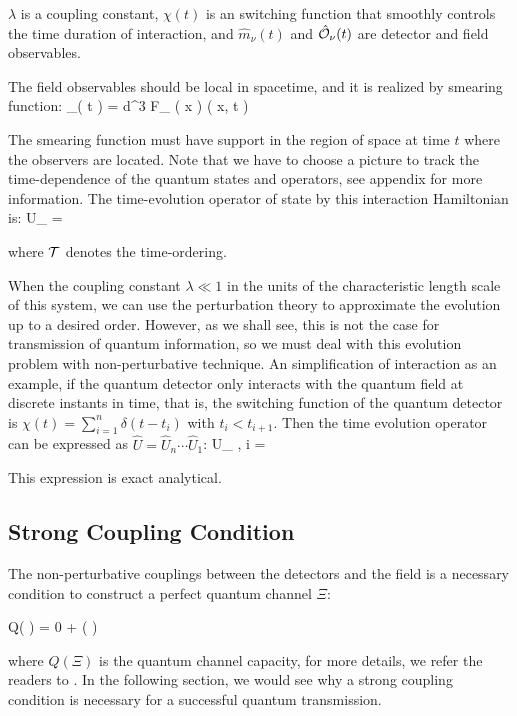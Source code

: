\documentclass[a4paper,12pt]{article}
\begin{document}
$ \lambda $ is a coupling constant, $\chi ( t )$ is an switching function that smoothly controls the time duration of interaction, and $\hat m_\nu( t )$ and $\hat{ \mathcal{ O } }_\nu ( t )$ are detector and field observables.

The field observables should be local in spacetime, and it is realized by smearing function:
\be
    _\nu ( t ) = \int{} d^{3}  F_{ \nu } ( \mb x )  ( \mb x, t )
\ee

The smearing function must have support in the region of space at time $t$ where the observers are located.
Note that we have to choose a picture to track the time-dependence of the quantum states and operators, see appendix for more information.
The time-evolution operator of state by this interaction Hamiltonian is:
\be
    \hat U_{ \nu } =  \exp {}
\ee

where $ \mathcal{ T } $ denotes the time-ordering. 

When the coupling constant $\lambda \ll 1$ in the units of the characteristic length scale of this system, we can use the perturbation theory to approximate the evolution up to a desired order.
However, as we shall see, this is not the case for transmission of quantum information, so we must deal with this evolution problem with non-perturbative technique.
An simplification of interaction as an example, if the quantum detector only interacts with the quantum field at discrete instants in time, that is, the switching function of the quantum detector is $ \chi ( t ) = \sum_{ i = 1 }^{ n } \delta ( t - t_i )$ with $ t_i < t_{ i + 1 } $.
Then the time evolution operator can be expressed as $ \hat U = \hat U_n \cdots \hat U_1 $:
\be
    \hat U_{ \nu, i } = \exp {}
\ee

This expression is exact analytical. 

\subsection*{Strong Coupling Condition}
The non-perturbative couplings between the detectors and the field is a necessary condition to construct a perfect quantum channel $\Xi$:

\be
    Q( \Xi  ) = 0 +  ( \lambda )
\ee

where $Q(\Xi)$ is the quantum channel capacity, for more details, we refer the readers to \cite{PhysRevD.101.036014}.
In the following section, we would see why a strong coupling condition is necessary for a successful quantum transmission.
\end{document}
